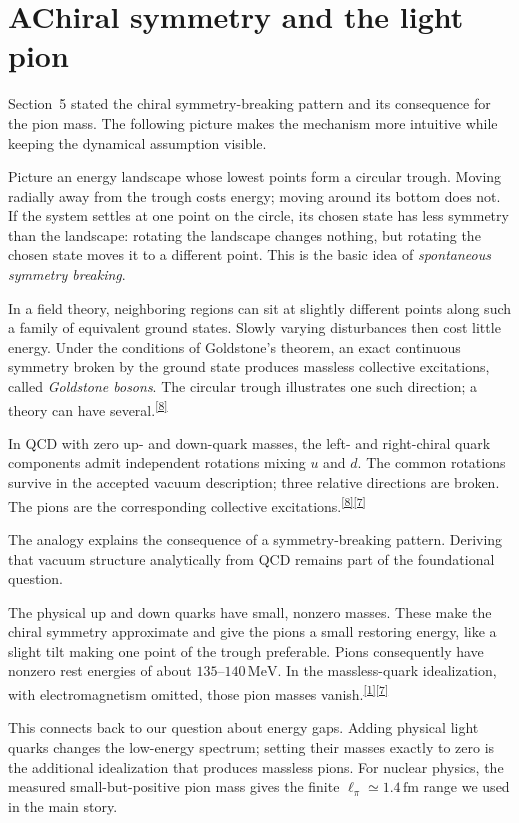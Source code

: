 \documentclass[11pt]{article}
\newcommand{\refn}[1]{\textsuperscript{\hyperlink{src#1}{[#1]}}}
\begin{document}
\section*{A\quad Chiral symmetry and the light pion}

Section~5 stated the chiral symmetry-breaking pattern and its consequence for the pion mass. The following picture makes the mechanism more intuitive while keeping the dynamical assumption visible.

Picture an energy landscape whose lowest points form a circular trough.
Moving radially away from the trough costs energy; moving around its bottom
does not. If the system settles at one point on the circle, its chosen state
has less symmetry than the landscape: rotating the landscape changes nothing,
but rotating the chosen state moves it to a different point. This is the
basic idea of \emph{spontaneous symmetry breaking}.

In a field theory, neighboring regions can sit at slightly different points
along such a family of equivalent ground states. Slowly varying disturbances
then cost little energy. Under the conditions of Goldstone's theorem, an
exact continuous symmetry broken by the ground state produces massless
collective excitations, called \emph{Goldstone bosons}. The circular trough
illustrates one such direction; a theory can have several.\refn{8}

In QCD with zero up- and down-quark masses, the left- and right-chiral quark components admit independent rotations mixing $u$ and $d$. The common rotations survive in the accepted vacuum description; three relative directions are broken. The pions are the corresponding collective excitations.\refn{8}\refn{7}

The analogy explains the consequence of a symmetry-breaking pattern. Deriving that vacuum structure analytically from QCD remains part of the foundational question.

The physical up and down quarks have small, nonzero masses. These make the
chiral symmetry approximate and give the pions a small restoring energy,
like a slight tilt making one point of the trough preferable. Pions
consequently have nonzero rest energies of about $135$--$140\,\mathrm{MeV}$.
In the massless-quark idealization, with electromagnetism omitted, those
pion masses vanish.\refn{1}\refn{7}

This connects back to our question about energy gaps. Adding physical light
quarks changes the low-energy spectrum; setting their masses exactly to zero
is the additional idealization that produces massless pions. For nuclear
physics, the measured small-but-positive pion mass gives the finite
$\ell_\pi\simeq1.4\,\mathrm{fm}$ range we used in the main story.
\end{document}
